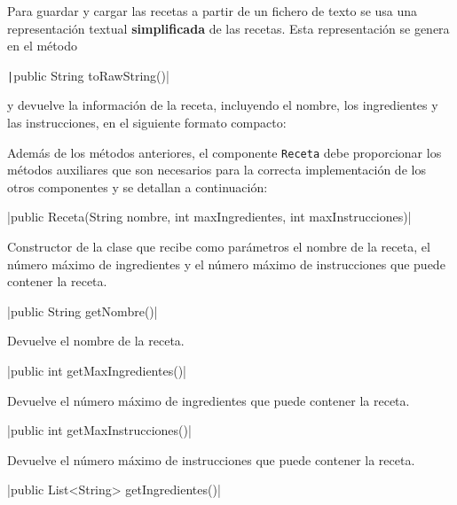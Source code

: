 \documentclass[
    a4paper, %
    12pt, %
]{CSSullivanBusinessReport}
\begin{document}
Para guardar y cargar las recetas a partir de un fichero de texto se usa una representación textual \textbf{simplificada} de las recetas. Esta representación se genera en el método

\texttt|public String toRawString()|

y devuelve la información de la receta, incluyendo el nombre, los ingredientes y las instrucciones, en el siguiente formato compacto:


Además de los métodos anteriores, el componente \texttt{Receta} debe proporcionar los métodos auxiliares que son necesarios para la correcta implementación de los otros componentes y se detallan a continuación:

|public Receta(String nombre, int maxIngredientes, int maxInstrucciones)|

Constructor de la clase que recibe como parámetros el nombre de la receta, el número máximo de ingredientes y el número máximo de instrucciones que puede contener la receta.

|public String getNombre()|

Devuelve el nombre de la receta.

|public int getMaxIngredientes()|

Devuelve el número máximo de ingredientes que puede contener la receta.

|public int getMaxInstrucciones()|

Devuelve el número máximo de instrucciones que puede contener la receta.

|public List<String> getIngredientes()|
\end{document}
